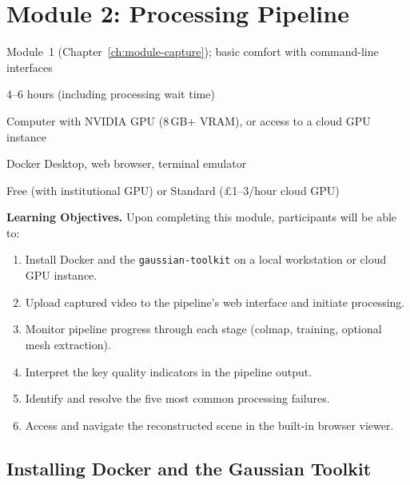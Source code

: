 \chapter{Module 2: Processing Pipeline}
\label{ch:module-processing}

\begin{tcolorbox}[
  enhanced,
  colback=LightGrey,
  colframe=MidGrey,
  fonttitle=\bfseries\sffamily,
  title={Module Information},
  sharp corners=south,
  boxrule=0.6pt
]
\begin{description}[font=\sffamily\bfseries, leftmargin=4cm, style=sameline]
  \item[Prerequisites] Module~1 (Chapter~\ref{ch:module-capture}); basic comfort with command-line interfaces
  \item[Duration] 4--6 hours (including processing wait time)
  \item[Hardware] Computer with NVIDIA GPU (8\,GB+ VRAM), or access to a cloud GPU instance
  \item[Software] Docker Desktop, web browser, terminal emulator
  \item[Budget tier] Free (with institutional GPU) or Standard (\pounds 1--3/hour cloud GPU)
\end{description}
\end{tcolorbox}

\medskip

\noindent\textbf{Learning Objectives.} Upon completing this module, participants will be able to:
\begin{enumerate}
  \item Install Docker and the \texttt{gaussian-toolkit} on a local workstation or cloud GPU instance.
  \item Upload captured video to the pipeline's web interface and initiate processing.
  \item Monitor pipeline progress through each stage (\acrshort{colmap}, training, optional mesh extraction).
  \item Interpret the key quality indicators in the pipeline output.
  \item Identify and resolve the five most common processing failures.
  \item Access and navigate the reconstructed scene in the built-in browser viewer.
\end{enumerate}

\section{Installing Docker and the Gaussian Toolkit}
\label{sec:proc-install}

